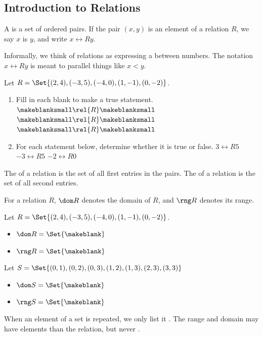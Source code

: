 \subsection{Introduction to Relations} 
\begin{definition}[Relation]
A  is a set of ordered pairs. If the pair $(x,y)$ is an element of a relation $R$, we say $x$ is  $y$, and write $x\rel{R}y$.
\end{definition}
\begin{Note}Informally, we think of relations as expressing a \makeblank between numbers. The notation $x\rel{R}y$ is meant to parallel things like $x<y$.\end{Note}
\begin{Example}
Let $R=\Set{(2,4), (-3,5), (-4,0), (1,-1), (0,-2)}$.
\begin{enumerate}\setabc
\item Fill in each blank to make a true statement.\lbr%
$\makeblanksmall\rel{R}\makeblanksmall$%
\qquad%
$\makeblanksmall\rel{R}\makeblanksmall$%
\qquad%
$\makeblanksmall\rel{R}\makeblanksmall$%
\item For each statement below, determine whether it is true or false.\lbr
$3\rel{R}5$ \makeblanksmall%
\qquad%
$-3\rel{R}5$ \makeblanksmall%
\qquad%
$-2\rel{R}0$ \makeblanksmall
\end{enumerate}
\end{Example}
\begin{definition}
The  of a relation is the set of all first entries in the pairs. The  of a relation is the set of all second entries.

For a relation $R$, $\dom R$ denotes the domain of $R$, and $\rng R$ denotes its range.
\end{definition}
\begin{Example}
Let $R=\Set{(2,4), (-3,5), (-4,0), (1,-1), (0,-2)}$.
\begin{itemize}
\item $\dom R=\Set{\makeblank}$
\item $\rng R=\Set{\makeblank}$
\end{itemize}
\end{Example}
\begin{Example}
Let $S=\Set{(0,1), (0,2), (0,3), (1,2), (1,3), (2,3), (3,3)}$
\begin{itemize}
\item $\dom S=\Set{\makeblank}$
\item $\rng S=\Set{\makeblank}$
\end{itemize}
\end{Example}
\begin{Note}When an element of a set is repeated, we only list it \makeblank[1in]. The range and domain may have \makeblank[1in] elements than the relation, but never \makeblank[1in].\end{Note}